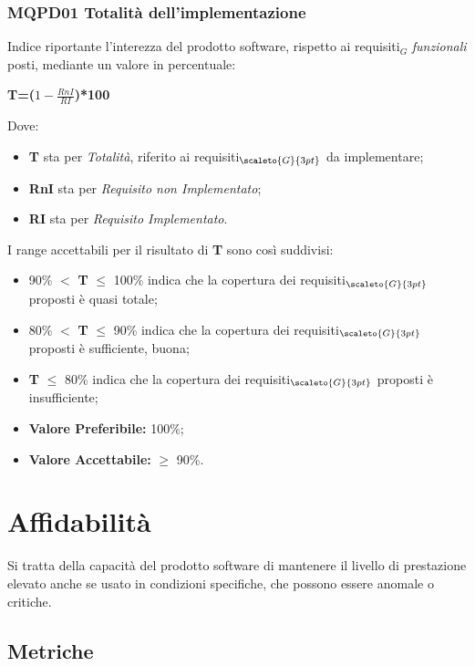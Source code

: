 \subsubsection{MQPD01 Totalità dell’implementazione} \label{QualitàDelProdottoFunzionalitàMetricheMQPD01}
Indice riportante l’interezza del prodotto software, rispetto ai requisiti$_G$ \textit{funzionali} posti, mediante un valore in percentuale:
\begin{center}
	\textbf{T=($1-\frac{RnI}{RI}$)*100}
\end{center}
Dove:
\begin{itemize}
	\item \textbf{T} sta per \textit{Totalità}, riferito ai requisiti$_{\scaleto{G}{3pt}}$ da implementare;
	\item \textbf{RnI} sta per \textit{Requisito non Implementato};
	\item \textbf{RI} sta per \textit{Requisito Implementato}.
\end{itemize}
I range accettabili per il risultato di \textbf{T} sono così suddivisi:
\begin{itemize}
	\item 90\% $<$ \textbf{T} $\leq$ 100\% indica che la copertura dei requisiti$_{\scaleto{G}{3pt}}$ proposti è quasi totale;
	\item 80\% $<$ \textbf{T} $\leq$ 90\% indica che la copertura dei requisiti$_{\scaleto{G}{3pt}}$ proposti è sufficiente, buona;
	\item \textbf{T} $\leq$ 80\% indica che la copertura dei requisiti$_{\scaleto{G}{3pt}}$ proposti è insufficiente;
	\item \textbf{Valore Preferibile:} 100\%;
	\item \textbf{Valore  Accettabile:} $\geq$ 90\%.
\end{itemize}

\section{Affidabilità} \label{QualitàDelProdottoAffidabilità}
Si tratta della capacità del prodotto software di mantenere il livello di prestazione elevato anche se usato in condizioni specifiche, che possono essere anomale o critiche.
\subsection{Metriche} \label{QualitàDelProdottoAffidabilitàMetriche}
